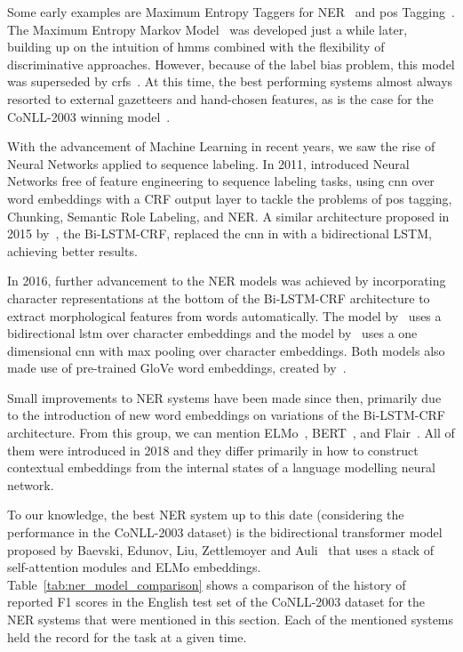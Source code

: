 \documentclass{nle}
\begin{document}
Some early examples are Maximum Entropy Taggers for NER~\cite{Borthwick1998} and
\gls{pos} Tagging~\cite{Ratnaparkhi1998}. The Maximum Entropy Markov Model~\cite{McCallum2000} 
was developed just a while later, building up on the intuition of \gls{hmm}s combined with
the flexibility of discriminative approaches. However, because of the label bias problem,
this model was superseded by \gls{crf}s~\cite{Lafferty2001}. %
At this time, the best performing systems almost always resorted to external gazetteers 
and hand-chosen features, as is the case for the {CoNLL-2003} winning model~\cite{Florian2003}.

With the advancement of Machine Learning in recent years, we saw the rise
of Neural Networks applied to sequence labeling. In 2011, \cite{Collobert2011} 
introduced Neural Networks free of feature engineering to sequence labeling tasks,
using \gls{cnn} over word embeddings with a CRF output layer to tackle 
the problems of \gls{pos} tagging, Chunking, Semantic Role Labeling, and NER. A similar architecture 
proposed in 2015 by~\cite{Huang2015}, the Bi-LSTM-CRF, replaced the \gls{cnn} in \cite{Collobert2011} 
with a bidirectional LSTM, achieving better results.

In 2016, further advancement to the NER models was achieved by incorporating character 
representations at the bottom of the Bi-LSTM-CRF architecture to extract morphological 
features from words automatically. The model by~\cite{Lample2016} uses a 
bidirectional \gls{lstm} over character embeddings and the model by~\cite{Ma2016} uses a
one dimensional \gls{cnn} with max pooling over character embeddings. Both models also 
made use of pre-trained GloVe word embeddings, created by~\cite{Pennington2014}.

Small improvements to NER systems have been made since then, primarily due to the 
introduction of new word embeddings on variations of the Bi-LSTM-CRF architecture. From
this group, we can mention ELMo~\cite{Peters2018}, BERT~\cite{Devlin2018}, and
Flair~\cite{Akbik2018}. 
All of them were introduced in 2018 and they differ primarily 
in how to construct contextual embeddings from the internal states of a language 
modelling neural network.

To our knowledge, the best NER system up to this date (considering the performance in the
{CoNLL-2003} dataset) is the bidirectional transformer model proposed by Baevski, Edunov, Liu, Zettlemoyer and Auli~ that uses
a stack of self-attention modules and ELMo embeddings. Table~\ref{tab:ner_model_comparison}
shows a comparison of the history of reported F1 scores in the English test set of the {CoNLL-2003} dataset
for the NER systems that were mentioned in this section. Each of the mentioned systems held the 
record for the task at a given time.
\end{document}
